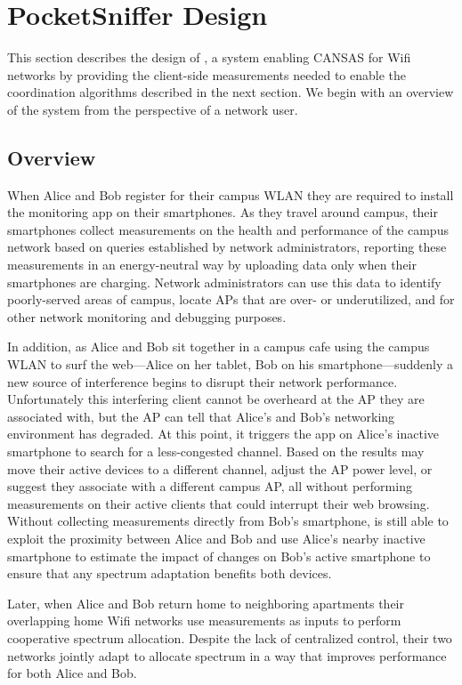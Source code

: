\section{PocketSniffer Design}
\label{sec-design}

This section describes the design of \PS{}, a system enabling CANSAS for Wifi
networks by providing the client-side measurements needed to enable the
coordination algorithms described in the next section. We begin with an
overview of the \PS{} system from the perspective of a network user.

\subsection{Overview}

When Alice and Bob register for their campus WLAN they are required to
install the \PS{} monitoring app on their smartphones. As they travel around
campus, their smartphones collect measurements on the health and performance
of the campus network based on queries established by network administrators,
reporting these measurements in an energy-neutral way by uploading data only
when their smartphones are charging. Network administrators can use this data
to identify poorly-served areas of campus, locate APs that are over- or
underutilized, and for other network monitoring and debugging purposes.

In addition, as Alice and Bob sit together in a campus cafe using the campus
WLAN to surf the web---Alice on her tablet, Bob on his smartphone---suddenly
a new source of interference begins to disrupt their network performance.
Unfortunately this interfering client cannot be overheard at the AP they
are associated with, but the AP can tell that Alice's and Bob's networking
environment has degraded. At this point, it triggers the \PS{} app on Alice's
inactive smartphone to search for a less-congested channel. Based on the
results \PS{} may move their active devices to a different channel, adjust
the AP power level, or suggest they associate with a different campus AP, all
without performing measurements on their active clients that could interrupt
their web browsing. Without collecting measurements directly from Bob's
smartphone, \PS{} is still able to exploit the proximity between Alice and
Bob and use Alice's nearby inactive smartphone to estimate the impact of
changes on Bob's active smartphone to ensure that any spectrum adaptation
benefits both devices.

Later, when Alice and Bob return home to neighboring apartments their
overlapping home Wifi networks use \PS{} measurements as inputs to perform
cooperative spectrum allocation. Despite the lack of centralized control,
their two networks jointly adapt to allocate spectrum in a way that improves
performance for both Alice and Bob.

